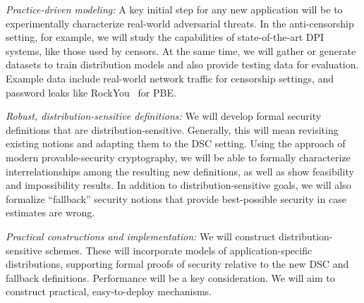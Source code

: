 {\begin{newenum}
\item{\em Practice-driven modeling:} A key initial step for any new application will be to 
experimentally characterize real-world adversarial threats. In the
anti-censorship setting, for example,  we will study the capabilities of state-of-the-art DPI
systems, like those used by censors.
At the same time, we will gather or generate datasets to train 
distribution models and also provide testing data for evaluation. 
Example data include real-world network traffic for censorship settings, 
and password leaks like RockYou~\cite{RockYou:2009} for PBE. 

\item{\em Robust, distribution-sensitive definitions:} 
We will develop formal security definitions that are
distribution-sensitive. Generally, this will mean revisiting existing notions
and adapting them to the DSC setting. Using the approach of modern 
provable-security cryptography, we will be able to formally characterize interrelationships among the resulting new
definitions, as well as show feasibility and impossibility results. 
In addition to distribution-sensitive goals, we will also formalize
``fallback'' security notions that provide best-possible security in case estimates are wrong.

\item{\em Practical constructions and implementation:}  
We will construct distribution-sensitive schemes. These will incorporate
models of application-specific distributions, supporting formal
proofs of security relative to the new DSC and fallback definitions. Performance will be a key consideration. We will
aim to construct practical, easy-to-deploy mechanisms.


\end{newenum}}

